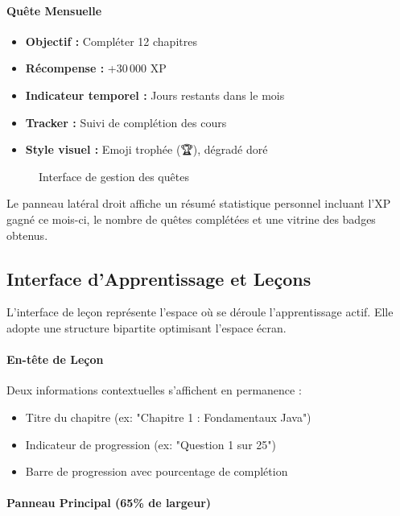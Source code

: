 \documentclass[12pt, a4paper]{report}
\begin{document}
\paragraph{Quête Mensuelle}
\begin{itemize}
    \item \textbf{Objectif :} Compléter 12 chapitres
    \item \textbf{Récompense :} +30\,000 XP
    \item \textbf{Indicateur temporel :} Jours restants dans le mois
    \item \textbf{Tracker :} Suivi de complétion des cours
    \item \textbf{Style visuel :} Emoji trophée (🏆), dégradé doré
\end{itemize}

\begin{figure}[H]
    \centering
    \caption{Interface de gestion des quêtes}
    \label{fig:quests}
\end{figure}

Le panneau latéral droit affiche un résumé statistique personnel incluant l'XP gagné ce mois-ci, le nombre de quêtes complétées et une vitrine des badges obtenus.

\subsection{Interface d'Apprentissage et Leçons}

L'interface de leçon représente l'espace où se déroule l'apprentissage actif. Elle adopte une structure bipartite optimisant l'espace écran.

\paragraph{En-tête de Leçon}
Deux informations contextuelles s'affichent en permanence :
\begin{itemize}
    \item Titre du chapitre (ex: "Chapitre 1 : Fondamentaux Java")
    \item Indicateur de progression (ex: "Question 1 sur 25")
    \item Barre de progression avec pourcentage de complétion
\end{itemize}

\paragraph{Panneau Principal (65\% de largeur)}
\end{document}
